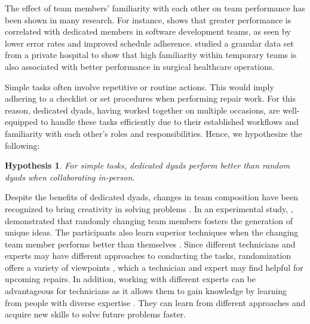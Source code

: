 \documentclass[msom,nonblindrev]{01 latex/class/informs3}
\newtheorem{hypothesis}{Hypothesis}
\begin{document}
The effect of team members' familiarity with each other on team performance has been shown in many research. For instance, \citet{huckman2009team} shows that greater performance is correlated with dedicated members in software development teams, as seen by lower error rates and improved schedule adherence. \citet{avgerinos2017team} studied a granular data set from a private hospital to show that high familiarity within temporary teams is also associated with better performance in surgical healthcare operations. 

Simple tasks often involve repetitive or routine actions. This would imply adhering to a checklist or set procedures when performing repair work. For this reason, dedicated dyads, having worked together on multiple occasions, are well-equipped to handle these tasks efficiently due to their established workflows and familiarity with each other's roles and responsibilities. Hence, we hypothesize the following:

\begin{hypothesis}\label{h:onsite_simple} 
For simple tasks, dedicated dyads perform better than random dyads when collaborating in-person.
\end{hypothesis}

Despite the benefits of dedicated dyads, changes in team composition have been recognized to bring creativity in solving problems \citep{gruenfeld2000groups}. In an experimental study, \citet{choi2005old}, demonstrated that randomly changing team members fosters the generation of unique ideas. The participants also learn superior techniques when the changing team member performs better than themselves \citep{kane2005knowledge}. Since different technicians and experts may have different approaches to conducting the tasks, randomization offers a variety of viewpoints \citep{edmondson2009product}, which a technician and expert may find helpful for upcoming repairs. In addition, working with different experts can be advantageous for technicians as it allows them to gain knowledge by learning from people with diverse expertise \citep{argote2012organizational}. They can learn from different approaches and acquire new skills to solve future problems faster.
\end{document}
